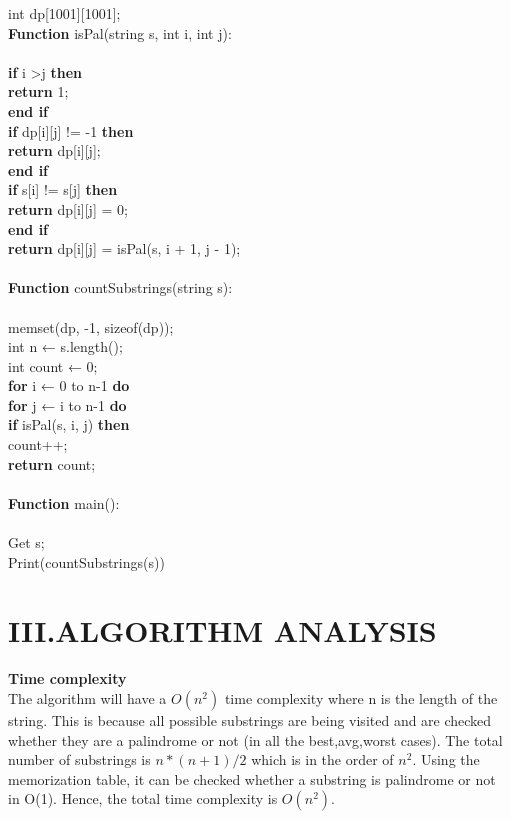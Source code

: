 \documentclass[twocolumn]{article}
\begin{document}
int dp[1001][1001];\\
\textbf{Function} isPal(string s, int i, int j):\\
\\
          \textbf{\qquad if} \:i \textgreater \:j 	\textbf{then} \\
         \textbf{return }  1;\\
\textbf{end if }	\\
	\textbf{if } dp[i][j] != -1 \textbf{then} \\
	  \textbf{return } dp[i][j];\\
	\textbf{end if }\\
	\textbf{if } s[i] != s[j]  \textbf{then}\\
	    \textbf{return }  dp[i][j] = 0;\\
\textbf{end if }\\
	  \textbf{return }  dp[i][j] = isPal(s, i + 1, j - 1);\\
\noindent 
\\
\textbf{Function} countSubstrings(string s):\\
\\
\noindent 
	memset(dp, -1, sizeof(dp));\\
	int n ← s.length();\\
	int count ← 0;\\
	\textbf{for}  i ←  0 to n-1 \textbf{do}\\
	    	\textbf{for}  j ←  i  to n-1  \textbf{do}\\
		\textbf{if } isPal(s, i, j) \textbf{then} 	 \\
count++;\\
	  \textbf{return }  count;\\
\\
\textbf{Function} main():    \\
\\
    Get s;\\
    Print(countSubstrings(s))


\section*{III.ALGORITHM ANALYSIS}
\textbf{Time complexity}\\
The algorithm will have a $O(n^2)$ time complexity where n is the length of the string.
 This is because all possible substrings are being visited and are checked whether they are a palindrome or not (in all the best,avg,worst cases).
 The total number of substrings is $n*(n+1)/2$ which is in the order of $n^2$. Using the memorization table, 
it can be checked whether a substring is palindrome or not in O(1). Hence, the total time complexity is $O(n^2)$. 
\end{document}
